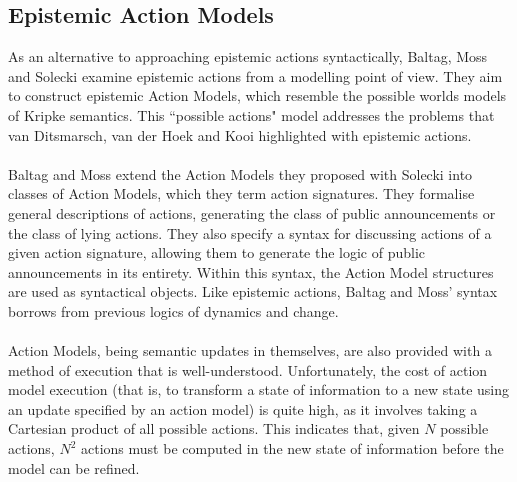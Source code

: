 \documentclass[12pt, a4paper, twoside]{article}
\begin{document}
\subsection{Epistemic Action Models} \label{act_mods}
As an alternative to approaching epistemic actions syntactically, Baltag, Moss
and Solecki examine epistemic actions from a modelling point of view.
They aim to construct epistemic Action Models, which resemble the possible
worlds models of Kripke semantics.
This ``possible actions" model addresses the problems that van Ditsmarsch, van
der Hoek and Kooi highlighted with epistemic actions.\\
\\
Baltag and Moss extend the Action Models they proposed with Solecki into classes
of Action Models, which they term action signatures.
They formalise general descriptions of actions, generating the class of
public announcements or the class of lying actions.
They also specify a syntax for discussing actions of a given action signature,
allowing them to generate the logic of public announcements in its entirety.
Within this syntax, the Action Model structures are used as syntactical objects.
Like epistemic actions, Baltag and Moss' syntax borrows from previous logics of
dynamics and change.\\
\\
Action Models, being semantic updates in themselves, are also provided with a
method of execution that is well-understood.
Unfortunately, the cost of action model execution (that is, to transform a state
of information to a new state using an update specified by an action model) is
quite high, as it involves taking a Cartesian product of all possible actions.
This indicates that, given $N$ possible actions, $N^2$ actions must be computed
in the new state of information before the model can be refined.
\end{document}
